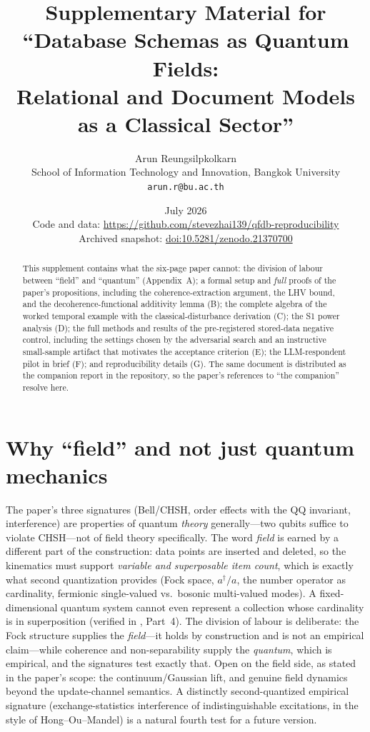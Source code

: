 \documentclass[11pt]{article}
\title{Supplementary Material for\\ ``Database Schemas as Quantum Fields:\\ Relational and Document Models as a Classical Sector''}
\author{Arun Reungsilpkolkarn\\ School of Information Technology and Innovation, Bangkok University\\ \texttt{arun.r@bu.ac.th}}
\date{July 2026 \\[2pt] \small Code and data: \url{https://github.com/stevezhai139/qfdb-reproducibility} \\ Archived snapshot: \href{https://doi.org/10.5281/zenodo.21370700}{doi:10.5281/zenodo.21370700}}
\theoremstyle{definition}
\begin{document}
\maketitle

\begin{abstract}
\noindent This supplement contains what the six-page paper cannot: the division of labour between ``field'' and ``quantum'' (Appendix~A); a formal setup and \emph{full} proofs of the paper's propositions, including the coherence-extraction argument, the LHV bound, and the decoherence-functional additivity lemma (B); the complete algebra of the worked temporal example with the classical-disturbance derivation (C); the S1 power analysis (D); the full methods and results of the pre-registered stored-data negative control, including the settings chosen by the adversarial search and an instructive small-sample artifact that motivates the acceptance criterion (E); the LLM-respondent pilot in brief (F); and reproducibility details (G). The same document is distributed as the companion report in the repository, so the paper's references to ``the companion'' resolve here.
\end{abstract}
\appendix

\section{Why ``field'' and not just quantum mechanics}
The paper's three signatures (Bell/CHSH, order effects with the QQ invariant, interference) are properties of quantum \emph{theory} generally---two qubits suffice to violate CHSH---not of field theory specifically. The word \emph{field} is earned by a different part of the construction: data points are inserted and deleted, so the kinematics must support \emph{variable and superposable item count}, which is exactly what second quantization provides (Fock space, $a^\dagger/a$, the number operator as cardinality, fermionic single-valued vs.\ bosonic multi-valued modes). A fixed-dimensional quantum system cannot even represent a collection whose cardinality is in superposition (verified in , Part~4). The division of labour is deliberate: the Fock structure supplies the \emph{field}---it holds by construction and is not an empirical claim---while coherence and non-separability supply the \emph{quantum}, which is empirical, and the signatures test exactly that. Open on the field side, as stated in the paper's scope: the continuum/Gaussian lift, and genuine field dynamics beyond the update-channel semantics. A distinctly second-quantized empirical signature (exchange-statistics interference of indistinguishable excitations, in the style of Hong--Ou--Mandel) is a natural fourth test for a future version.
\end{document}
